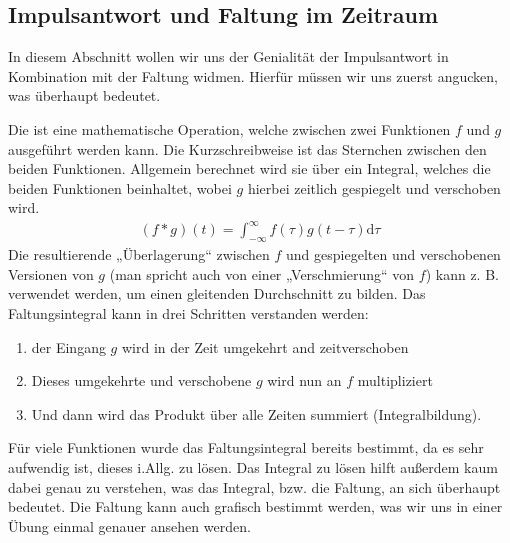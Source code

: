 \documentclass[letterpaper,10pt,english]{jupyterBook}
\begin{document}
\sphinxAtStartPar
{}


\subsection{Impulsantwort und Faltung im Zeitraum}
\label{\detokenize{content/5_ImpulsSprung:impulsantwort-und-faltung-im-zeitraum}}
\sphinxAtStartPar


\sphinxAtStartPar
In diesem Abschnitt wollen wir uns der Genialität der Impulsantwort in Kombination mit der Faltung widmen.
Hierfür müssen wir uns zuerst angucken, was  überhaupt bedeutet.

\sphinxAtStartPar
Die  ist eine mathematische Operation, welche zwischen zwei Funktionen \(f\) und \(g\) ausgeführt werden kann. Die Kurzschreibweise ist das Sternchen zwischen den beiden Funktionen. Allgemein berechnet wird sie über ein Integral, welches die beiden Funktionen beinhaltet, wobei \(g\) hierbei zeitlich gespiegelt und verschoben wird.
\begin{equation*}
\begin{split}(f \ast g)(t) = \int_{-\infty}^{\infty} f(\tau)g(t-\tau) \mathrm{d}\tau\end{split}
\end{equation*}
\sphinxAtStartPar
Die resultierende „Überlagerung“ zwischen \(f\) und gespiegelten und verschobenen Versionen von \(g\) (man spricht auch von einer „Verschmierung“ von \(f\)) kann z. B. verwendet werden, um einen gleitenden Durchschnitt zu bilden.
Das Faltungsintegral kann in drei Schritten verstanden werden:
\begin{enumerate}
%
\item {} 
\sphinxAtStartPar
der Eingang \(g\) wird in der Zeit umgekehrt and zeitverschoben

\item {} 
\sphinxAtStartPar
Dieses umgekehrte und verschobene \(g\) wird nun an \(f\) multipliziert

\item {} 
\sphinxAtStartPar
Und dann wird das Produkt über alle Zeiten summiert (Integralbildung).

\end{enumerate}

\sphinxAtStartPar
Für viele Funktionen wurde das Faltungsintegral bereits bestimmt, da es sehr aufwendig ist, dieses i.Allg. zu lösen.
Das Integral zu lösen hilft außerdem kaum dabei genau zu verstehen, was das Integral, bzw. die Faltung, an sich überhaupt bedeutet. Die Faltung kann auch grafisch bestimmt werden, was wir uns in einer Übung einmal genauer ansehen werden.
\end{document}
